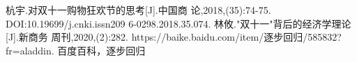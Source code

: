 
    \begin{thebibliography}{40}
        杭宇.对双十一购物狂欢节的思考[J].中国商
        论,2018,(35):74-75. DOI:10.19699/j.cnki.issn209
        6-0298.2018.35.074.
        林攸."双十一"背后的经济学理论[J].新商务
        周刊,2020,(2):282.
        https://baike.baidu.com/item/逐步回归/585832?fr=aladdin.
        百度百科，逐步回归
    
    \end{thebibliography}
    \newpage